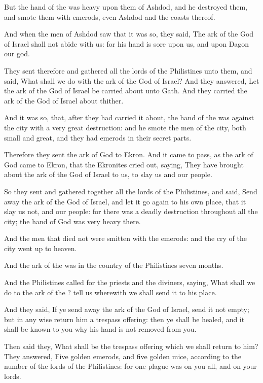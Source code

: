 \Verse But the hand of the \LORD was heavy upon them of Ashdod, and he destroyed them, and smote them with emerods, even Ashdod and the coasts thereof.

\Verse And when the men of Ashdod saw that it was so, they said, The ark of the God of Israel shall not abide with us: for his hand is sore upon us, and upon Dagon our god.

\Verse They sent therefore and gathered all the lords of the Philistines unto them, and said, What shall we do with the ark of the God of Israel? And they answered, Let the ark of the God of Israel be carried about unto Gath. And they carried the ark of the God of Israel about thither.

\Verse And it was so, that, after they had carried it about, the hand of the \LORD was against the city with a very great destruction: and he smote the men of the city, both small and great, and they had emerods in their secret parts.

\Verse Therefore they sent the ark of God to Ekron. And it came to pass, as the ark of God came to Ekron, that the Ekronites cried out, saying, They have brought about the ark of the God of Israel to us, to slay us and our people.

\Verse So they sent and gathered together all the lords of the Philistines, and said, Send away the ark of the God of Israel, and let it go again to his own place, that it slay us not, and our people: for there was a deadly destruction throughout all the city; the hand of God was very heavy there.

\Verse And the men that died not were smitten with the emerods: and the cry of the city went up to heaven.


\Chapter
\Verse And the ark of the \LORD was in the country of the Philistines seven months.

\Verse And the Philistines called for the priests and the diviners, saying, What shall we do to the ark of the \LORD? tell us wherewith we shall send it to his place.

\Verse And they said, If ye send away the ark of the God of Israel, send it not empty; but in any wise return him a trespass offering: then ye shall be healed, and it shall be known to you why his hand is not removed from you.

\Verse Then said they, What shall be the trespass offering which we shall return to him? They answered, Five golden emerods, and five golden mice, according to the number of the lords of the Philistines: for one plague was on you all, and on your lords.

